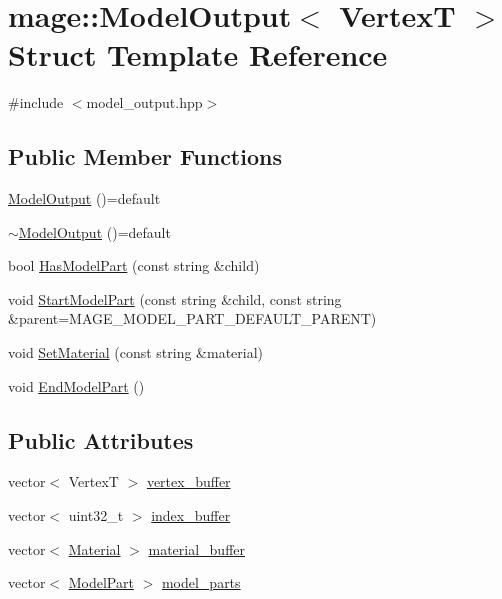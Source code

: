 \hypertarget{structmage_1_1_model_output}{}\section{mage\+:\+:Model\+Output$<$ VertexT $>$ Struct Template Reference}
\label{structmage_1_1_model_output}


{\ttfamily \#include $<$model\+\_\+output.\+hpp$>$}

\subsection*{Public Member Functions}
\begin{DoxyCompactItemize}
\item 
\hyperlink{structmage_1_1_model_output_a7d64b57d8207968541eb9c6da6ef0163}{Model\+Output} ()=default
\item 
\hyperlink{structmage_1_1_model_output_a69a7f27486ad287943cbf973107ad8e1}{$\sim$\+Model\+Output} ()=default
\item 
bool \hyperlink{structmage_1_1_model_output_a23ce6e3b252227781c173149b76e73ee}{Has\+Model\+Part} (const string \&child)
\item 
void \hyperlink{structmage_1_1_model_output_a86b2e4d9885193fb796b309e6104abc9}{Start\+Model\+Part} (const string \&child, const string \&parent=M\+A\+G\+E\+\_\+\+M\+O\+D\+E\+L\+\_\+\+P\+A\+R\+T\+\_\+\+D\+E\+F\+A\+U\+L\+T\+\_\+\+P\+A\+R\+E\+NT)
\item 
void \hyperlink{structmage_1_1_model_output_abd614f9f2e9f9dbc0b2c354ee37f2998}{Set\+Material} (const string \&material)
\item 
void \hyperlink{structmage_1_1_model_output_a5df0c4240b1fac61ac0cdbf9766bb98d}{End\+Model\+Part} ()
\end{DoxyCompactItemize}
\subsection*{Public Attributes}
\begin{DoxyCompactItemize}
\item 
vector$<$ VertexT $>$ \hyperlink{structmage_1_1_model_output_a8180bf5262d435a394936d50f056c4a3}{vertex\+\_\+buffer}
\item 
vector$<$ uint32\+\_\+t $>$ \hyperlink{structmage_1_1_model_output_a0c49359544b7d3c961118caa629f6405}{index\+\_\+buffer}
\item 
vector$<$ \hyperlink{structmage_1_1_material}{Material} $>$ \hyperlink{structmage_1_1_model_output_a66764a4d8c7e5b099e51013f385f13bf}{material\+\_\+buffer}
\item 
vector$<$ \hyperlink{structmage_1_1_model_part}{Model\+Part} $>$ \hyperlink{structmage_1_1_model_output_ac101de6237d4de379f7f85bbdf71dc46}{model\+\_\+parts}
\end{DoxyCompactItemize}
